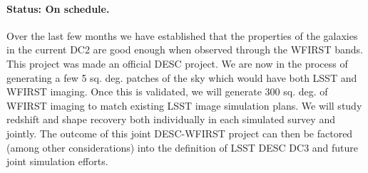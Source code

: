 \paragraph*{Status: On schedule.} Over the last few months we have established that the properties of the galaxies in the current DC2 are good enough when observed through the WFIRST bands. This project was made an official DESC project. We are now in the process of generating a few 5 sq. deg. patches of the sky which would have both LSST and WFIRST imaging. Once this is validated, we will generate 300 sq. deg. of WFIRST imaging to match existing LSST image simulation plans. We will study redshift and shape recovery both individually in each simulated survey and jointly. The outcome of this joint DESC-WFIRST project can then be factored (among other considerations) into the definition of LSST DESC DC3 and future joint simulation efforts.

